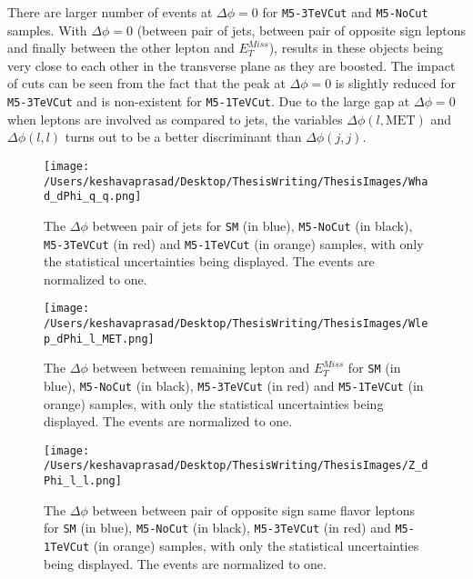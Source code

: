 There are larger number of events at $\Delta\phi=0$ for \texttt{M5-3TeVCut} and \texttt{M5-NoCut} samples. With $\Delta\phi=0$ (between pair of jets, between pair of opposite sign leptons and finally between the other lepton and $E^{Miss}_{T}$), results in these objects being very close to each other in the transverse plane as they are boosted. The impact of cuts can be seen from the fact that the peak at $\Delta\phi=0$ is slightly reduced for \texttt{M5-3TeVCut} and is non-existent for \texttt{M5-1TeVCut}. Due to the large gap at $\Delta\phi=0$ when leptons are involved as compared to jets, the variables $\Delta\phi(l,\text{MET})$ and $\Delta\phi(l,l)$ turns out to be a better discriminant than $\Delta\phi(j,j)$.
\begin{figure}[!htb]%
\centering
\texttt{[image: /Users/keshavaprasad/Desktop/ThesisWriting/ThesisImages/Whad\_dPhi\_q\_q.png]}
\caption{The $\Delta\phi$ between pair of jets for \texttt{SM} (in blue), \texttt{M5-NoCut} (in black), \texttt{M5-3TeVCut} (in red) and \texttt{M5-1TeVCut} (in orange) samples, with only the statistical uncertainties being displayed. The events are normalized to one.}
\label{Whad-dPhi-PostCuts}
\end{figure}
\begin{figure}[!htb]%
\centering
\texttt{[image: /Users/keshavaprasad/Desktop/ThesisWriting/ThesisImages/Wlep\_dPhi\_l\_MET.png]}
\caption{The $\Delta\phi$ between between remaining lepton and $E^{Miss}_{T}$  for \texttt{SM} (in blue), \texttt{M5-NoCut} (in black), \texttt{M5-3TeVCut} (in red) and \texttt{M5-1TeVCut} (in orange) samples, with only the statistical uncertainties being displayed. The events are normalized to one.}
\label{WLepMeT-dPhi-PostCuts}
\end{figure}
\begin{figure}[!htb]%
\centering
\texttt{[image: /Users/keshavaprasad/Desktop/ThesisWriting/ThesisImages/Z\_dPhi\_l\_l.png]}
\caption{The $\Delta\phi$ between between pair of opposite sign same flavor leptons for \texttt{SM} (in blue), \texttt{M5-NoCut} (in black), \texttt{M5-3TeVCut} (in red) and \texttt{M5-1TeVCut} (in orange) samples, with only the statistical uncertainties being displayed. The events are normalized to one.}
\label{ZleplepdPhi-PostCuts}
\end{figure}


